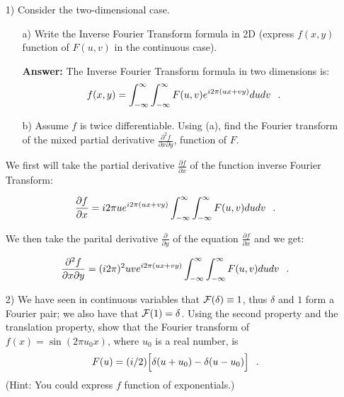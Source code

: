 \documentclass{article}
\begin{document}
\begin{enumerate}

\item[1)] Consider the two-dimensional case.
\begin{enumerate}
\item[a)] Write the Inverse Fourier Transform formula in 2D (express $f(x,y)$ function of $F(u,v)$ in the continuous case). 

\textbf{Answer: }The Inverse Fourier Transform formula in two dimensions is:
$$f(x,y) = \int_{-\infty}^{\infty} \int_{-\infty}^{\infty} F(u,v) e^{i2 \pi (ux + vy)} du dv \hspace{0.1in} .$$

\item[b)] Assume $f$ is twice differentiable. Using (a), find the Fourier transform of the mixed partial derivative $\frac{\partial^2 f}{\partial x\partial y}$, function of $F$.
\end{enumerate}

We first will take the partial derivative $\frac{\partial f}{\partial x}$ of the function inverse Fourier Transform:

\begin{equation}
\frac{\partial f}{\partial x} = i2\pi u e^{i2 \pi (ux + vy)} \int_{-\infty}^{\infty} \int_{-\infty}^{\infty} F(u,v) du dv \hspace{0.1in} .
\end{equation}

We then take the parital derivative $\frac{\partial}{\partial y}$ of the equation $\frac{\partial f}{\partial x}$ and we get:

\begin{equation}
\frac{\partial ^2 f}{\partial x \partial y} = (i2\pi )^2 uv e^{i2 \pi (ux + vy)} \int_{-\infty}^{\infty} \int_{-\infty}^{\infty} F(u,v) du dv \hspace{0.1in} .
\end{equation}

\item[2)] We have seen in continuous variables that ${\cal F}(\delta)\equiv 1$, thus $\delta$ and $1$ form a Fourier pair; we also have that ${\cal F}(1)=\delta$. Using the second property 
and the translation property, show that the Fourier transform of $f(x)=\sin(2\pi u_0x)$, where $u_0$ is a real number, is 
$$F(u)=(i/2)\Big[\delta(u+u_0)-\delta(u-u_0)\Big] \hspace{0.1in}.$$
(Hint: You could express  $f$ function of exponentials.)


\end{enumerate}
\end{document}
